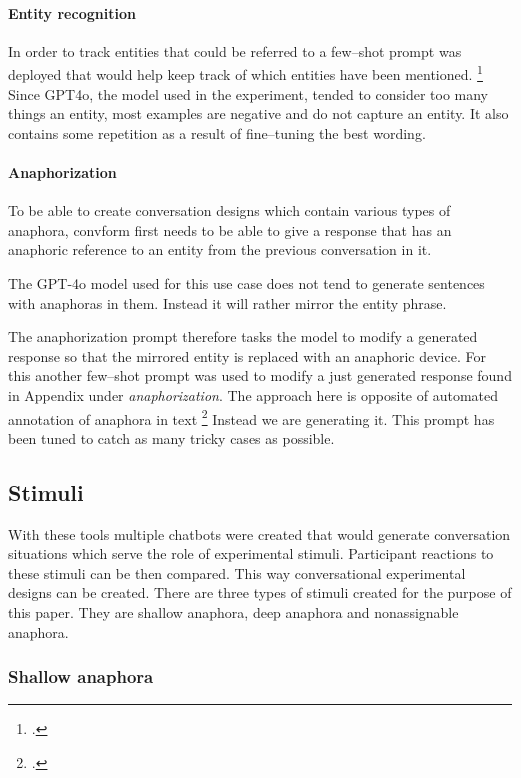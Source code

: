 \documentclass[12pt]{report}
\begin{document}
{\paragraph{Entity recognition}

In order to track entities that could be referred to
a few–shot prompt was deployed that would help
keep track of which entities have been mentioned. \footcite{Loiciga2022NewOO}
Since GPT4o, the model used in the experiment,
tended to consider too many things an entity,
most examples are negative and do not capture an entity.
It also contains some repetition as a result of fine–tuning the best wording.

\paragraph{Anaphorization}

To be able to create conversation designs which contain various types of anaphora,
convform first needs to be able to give a response that
has an anaphoric reference to an entity from the previous conversation in it.

The GPT-4o model used for this use case
does not tend to generate sentences with anaphoras in them.
Instead it will rather mirror the entity phrase.

The anaphorization prompt therefore tasks the model
to modify a generated response so
that the mirrored entity is replaced with
an anaphoric device.
For this another few–shot prompt was used to modify a just generated response
found in Appendix under \textit{anaphorization}.
The approach here is opposite of automated annotation of anaphora in text \footcite{loaiciga-etal-2022-anaphoric}
Instead we are generating it.
This prompt has been tuned to catch as many tricky cases as possible.

\subsection{Stimuli}

With these tools
multiple chatbots were created
that would generate conversation situations
which serve the role of experimental stimuli.
Participant reactions to these stimuli
can be then compared.
This way conversational experimental designs can be created.
There are three types of stimuli created
for the purpose of this paper.
They are shallow anaphora, deep anaphora and nonassignable anaphora.

\subsubsection{Shallow anaphora}

}
\end{document}
